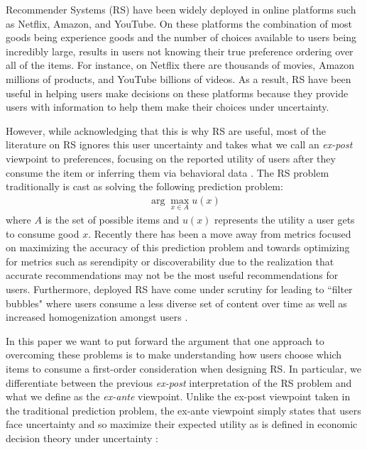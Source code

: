 \documentclass[sigconf]{acmart}
\begin{document}
Recommender Systems (RS) have been widely deployed in online platforms such as Netflix, Amazon, and YouTube. On these platforms the combination of most goods being experience goods and the number of choices available to users being incredibly large, results in users not knowing their true preference ordering over all of the items. For instance, on Netflix there are thousands of movies, Amazon millions of products, and YouTube billions of videos. As a result, RS have been useful in helping users make decisions on these platforms because they provide users with information to help them make their choices under uncertainty. 
\par
However, while acknowledging that this is why RS are useful, most of the literature on RS ignores this user uncertainty and takes what we call an \textit{ex-post} viewpoint to preferences, focusing on the reported utility of users after they consume the item or inferring them via behavioral data \cite{adomavicius2005toward, zhao2018interpreting}. The RS problem traditionally is cast as solving the following prediction problem:
\begin{align*}
\arg\max\limits_{x \in A} u(x)
\end{align*}
\noindent where $A$ is the set of possible items and $u(x)$ represents the utility a user gets to consume good $x$. Recently there has been a move away from metrics focused on maximizing the accuracy of this prediction problem and towards optimizing for metrics such as serendipity or discoverability \cite{mcnee2006being, vargas2011rank} due to  the realization that accurate recommendations may not be the most useful recommendations for users. Furthermore, deployed RS have come under scrutiny for leading to ``filter bubbles" \cite{pariser2011filter} where users consume a less diverse set of content over time as well as increased homogenization amongst users \cite{chaney2018algorithmic, hosanagar2013will}.
\par
In this paper we want to put forward the argument that one approach to overcoming these problems is to make understanding how users choose which items to consume a first-order consideration when designing RS. In particular, we differentiate between the previous \textit{ex-post} interpretation of the RS problem and what we define as the \textit{ex-ante} viewpoint. Unlike the ex-post viewpoint taken in the traditional prediction problem, the ex-ante viewpoint simply states that users face uncertainty and so maximize their expected utility as is defined in economic decision theory under uncertainty \citep[see e.g.][]{mas1995microeconomic}:
\end{document}

